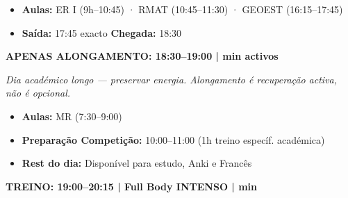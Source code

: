 \documentclass[a4paper,11pt]{article}
\newcommand{\badge}[2]{%
  \colorbox{#1}{\color{white}\footnotesize\textbf{\strut\;#2\;}}%
}
\begin{document}
\begin{tcolorbox}[daybox, title={\badge{along}{TERÇA} \quad Dia Longo + Alongamento}]
  \begin{itemize}[leftmargin=1em, itemsep=2pt]
    \item \textbf{Aulas:} ER I (9h--10:45) · RMAT (10:45--11:30) · GEOEST (16:15--17:45)
    \item \textbf{Saída:} 17:45 exacto \quad \textbf{Chegada:} 18:30
  \end{itemize}
  \vspace{4pt}
  \begin{tcolorbox}[enhanced, colback=along!10, colframe=along, sharp corners, boxrule=1pt, left=5pt]
    \textbf{APENAS ALONGAMENTO: 18:30--19:00 \;| min activos}
  \end{tcolorbox}
  \vspace{4pt}
  {\small\color{graytext}\textit{Dia académico longo — preservar energia. Alongamento é recuperação activa, não é opcional.}}
\end{tcolorbox}

\vspace{6pt}

\begin{tcolorbox}[daybox, title={\badge{intenso}{QUARTA} \quad Full Body Intenso + Competição Académica}]
  \begin{itemize}[leftmargin=1em, itemsep=2pt]
    \item \textbf{Aulas:} MR (7:30--9:00)
    \item \textbf{Preparação Competição:} 10:00--11:00 (1h treino específ. académica)
    \item \textbf{Rest do dia:} Disponível para estudo, Anki e Francês
  \end{itemize}
  \vspace{4pt}
  \begin{tcolorbox}[enhanced, colback=intenso!10, colframe=intenso, sharp corners, boxrule=1pt, left=5pt]
    \textbf{TREINO: 19:00--20:15 \;|\; Full Body INTENSO \;| min}
  \end{tcolorbox}
\end{tcolorbox}

\vspace{6pt}
\end{document}
